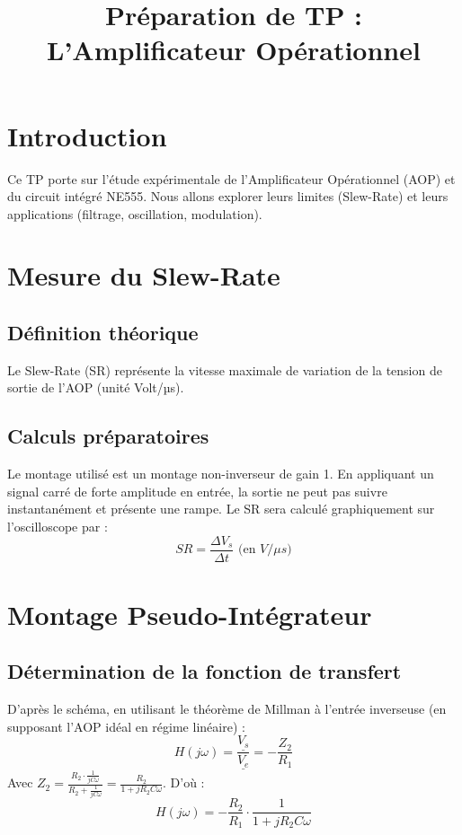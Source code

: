 \documentclass[12pt, a4paper]{article}
\title{Préparation de TP : L'Amplificateur Opérationnel}
\date{}
\begin{document}
\maketitle

\tableofcontents 

\newpage

\section{Introduction}
Ce TP porte sur l'étude expérimentale de l'Amplificateur Opérationnel (AOP) et du circuit intégré NE555. Nous allons explorer leurs limites (Slew-Rate) et leurs applications (filtrage, oscillation, modulation).



\section{Mesure du Slew-Rate}
\subsection{Définition théorique}
Le Slew-Rate (SR) représente la vitesse maximale de variation de la tension de sortie de l'AOP (unité Volt/µs). 

\subsection{Calculs préparatoires}
Le montage utilisé est un montage non-inverseur de gain 1. En appliquant un signal carré de forte amplitude en entrée, la sortie ne peut pas suivre instantanément et présente une rampe. 
Le SR sera calculé graphiquement sur l'oscilloscope par :
$$SR = \frac{\Delta V_s}{\Delta t} \text{ (en } V/\mu s\text{)}$$


\section{Montage Pseudo-Intégrateur}
\subsection{Détermination de la fonction de transfert}
D'après le schéma, en utilisant le théorème de Millman à l'entrée inverseuse (en supposant l'AOP idéal en régime linéaire) :
$$H(j\omega) = \frac{\underline{V_s}}{\underline{V_e}} = -\frac{Z_2}{R_1}$$
Avec $Z_2 = \frac{R_2 \cdot \frac{1}{jC\omega}}{R_2 + \frac{1}{jC\omega}} = \frac{R_2}{1 + jR_2C\omega}$.
D'où :
$$H(j\omega) = -\frac{R_2}{R_1} \cdot \frac{1}{1 + jR_2C\omega}$$
\end{document}
